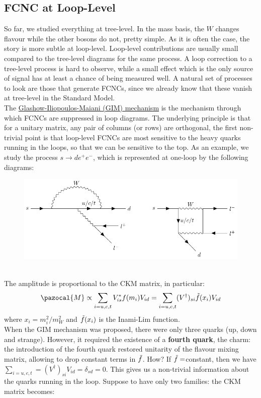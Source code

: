 \documentclass[../main.tex]{subfiles}
\begin{document}
\subsection{FCNC at Loop-Level}
So far, we studied everything at tree-level. In the mass basis, the $W$ changes flavour while the other bosons do not, pretty simple. As it is often the case, the story is more subtle at loop-level. Loop-level contributions are usually small compared to the tree-level diagrams for the same process. A loop correction to a tree-level process is hard to observe, while a small effect which is the only source of signal has at least a chance of being measured well. A
natural set of processes to look are those that generate FCNCs, since we already know that these vanish at tree-level in the Standard Model.\\
The \href{https://en.wikipedia.org/wiki/GIM_mechanism}{Glashow-Iliopoulos-Maiani (GIM) mechanism} is the mechanism through which FCNCs are suppressed in loop diagrams. The underlying principle is that for a unitary matrix, any pair of columns (or rows) are orthogonal, the first non-trivial point is that
loop-level FCNCs are most sensitive to the heavy quarks running in the loops, so that we can be sensitive to the top. As an example, we study the process $s\to de^+e^-$, which is represented at one-loop by the following diagrams:\\
\begin{figure}[h]
    \centering
    \includegraphics{Images/gim.pdf}
    \caption*{}
\end{figure}\\
The amplitude is proportional to the CKM matrix, in particular:
\[
\pazocal{M}\propto\sum_{i=u,c,t}V_{is}^*f(m_i)V_{id}=\sum_{i=u,c,t}(V^\dagger)_{si}\Tilde{f}(x_i)V_{id}
\]
where $x_i=m_i^2/m_W^2$ and $\Tilde{f}(x_i)$ is the Inami-Lim function.\\
When the GIM mechanism was proposed, there were only three quarks (up, down and strange). However, it required the existence of a \textbf{fourth quark}, the charm: the introduction of the fourth quark restored unitarity of the flavour mixing matrix, allowing to drop constant terms in $\Tilde{f}$. How? If $\Tilde{f}=$constant, then we have $\sum_{i=u,c,t}=(V^\dagger)_{si}V_{id}=\delta_{sd}=0$. This gives us a non-trivial information about the quarks running in the loop. Suppose to have only two families: the CKM matrix becomes:
\end{document}
